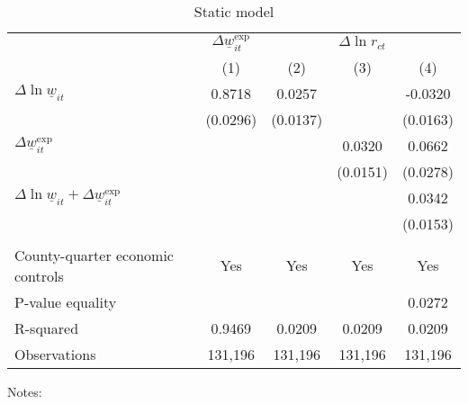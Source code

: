 \begin{table}
    \caption{Static model}
    \label{tab:static}

    \begin{tabular}{l*{4}{c}}
    \toprule
     & \multicolumn{1}{c}{$\Delta \underline{w}_{it}^{\text{exp}}$}
     & \multicolumn{3}{c}{$\Delta \ln r_{ct}$}                                   \\ \cmidrule(lr){2-2}\cmidrule(lr){3-5}
     & \multicolumn{1}{c}{(1)} & \multicolumn{1}{c}{(2)} 
     & \multicolumn{1}{c}{(3)} & \multicolumn{1}{c}{(4)}                         \\ \midrule
    $\Delta \ln \underline{w}_{it}$           &  0.8718  &  0.0257  &       &  -0.0320     \\
                                              & (0.0296) & (0.0137) &       & (0.0163)    \\
    $\Delta \underline{w}_{it}^{\text{exp}}$  &       &       &  0.0320  & 0.0662      \\
                                              &       &       & (0.0151) & (0.0278)    \\ \midrule
    $\Delta \ln \underline{w}_{it}+
      \Delta \underline{w}_{it}^{\text{exp}}$ &       &       &       &  0.0342     \\
                                              &       &       &       & (0.0153)    \\
                                              &       &       &       &          \\ \midrule
    County-quarter economic controls          &  Yes  & Yes   & Yes   & Yes      \\
    P-value equality                          &       &       &       & 0.0272      \\
    R-squared                                 &  0.9469  &  0.0209  &  0.0209  & 0.0209      \\
    Observations                              & 131,196  & 131,196  & 131,196  & 131,196     \\\bottomrule
    \end{tabular}

    \begin{minipage}{.95\textwidth} \footnotesize
        \vspace{2mm}
        Notes: 
    \end{minipage}
\end{table}
